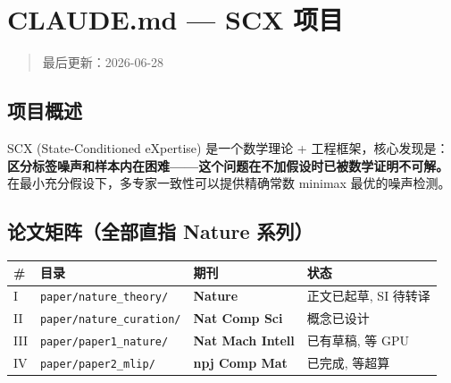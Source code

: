 \documentclass[
  12pt,
]{ctexart}
\author{SCX}
\date{2026}
\begin{document}
\section{CLAUDE.md --- SCX 项目}\label{claude.md-scx-ux9879ux76ee}

\begin{quote}
最后更新：2026-06-28
\end{quote}

\subsection{项目概述}\label{ux9879ux76eeux6982ux8ff0}

SCX (State-Conditioned eXpertise) 是一个数学理论 +
工程框架，核心发现是：\textbf{区分标签噪声和样本内在困难------这个问题在不加假设时已被数学证明不可解。}
在最小充分假设下，多专家一致性可以提供精确常数 minimax 最优的噪声检测。

\subsection{论文矩阵（全部直指 Nature
系列）}\label{ux8bbaux6587ux77e9ux9635ux5168ux90e8ux76f4ux6307-nature-ux7cfbux5217}

\begin{longtable}[]{@{}
  >{\centering\arraybackslash}p{}
  >{\raggedright\arraybackslash}p{}
  >{\raggedright\arraybackslash}p{}
  >{\centering\arraybackslash}p{}@{}}
\toprule\noalign{}
\begin{minipage}[b]{\linewidth}\centering
\#
\end{minipage} & \begin{minipage}[b]{\linewidth}\raggedright
目录
\end{minipage} & \begin{minipage}[b]{\linewidth}\raggedright
期刊
\end{minipage} & \begin{minipage}[b]{\linewidth}\centering
状态
\end{minipage} \\
\midrule\noalign{}
\endhead
\bottomrule\noalign{}
\endlastfoot
I & \texttt{paper/nature\_theory/} & \textbf{Nature} & 正文已起草, SI
待转译 \\
II & \texttt{paper/nature\_curation/} & \textbf{Nat Comp Sci} &
概念已设计 \\
III & \texttt{paper/paper1\_nature/} & \textbf{Nat Mach Intell} &
已有草稿, 等 GPU \\
IV & \texttt{paper/paper2\_mlip/} & \textbf{npj Comp Mat} & 已完成,
等超算 \\
\end{longtable}
\end{document}

